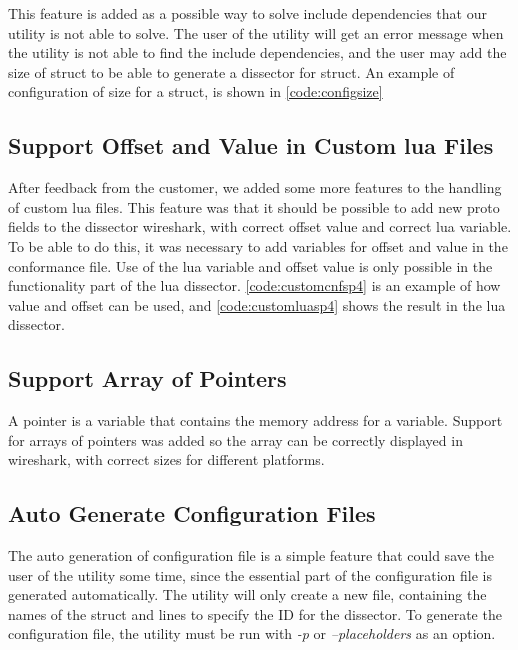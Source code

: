 This feature is added as a possible way to solve include dependencies that our 
\gls{utility} is not able to solve. The user of the \gls{utility} will get an error 
message when the \gls{utility} is not able to find the include dependencies, and the 
user may add the size of \gls{struct} to be able to generate a \gls{dissector} for \gls{struct}. 
An example of configuration of size for a \gls{struct}, is shown in 
\autoref{code:configsize}



\subsection{Support Offset and Value in Custom \Gls{lua} Files}
After feedback from the customer, we added some more features to 
the handling of custom \Gls{lua} files. This feature was that it should be possible 
to add new proto fields to the \gls{dissector} \Gls{wireshark}, with correct offset value 
and correct \Gls{lua} variable. To be able to do this, it was necessary to add
variables for offset and value in the conformance file. Use of the \Gls{lua} 
variable and offset value is only possible in the functionality part of the 
\Gls{lua} \gls{dissector}. \autoref{code:customcnfsp4} is an example of how value and 
offset can be used, and \autoref{code:customluasp4} shows the result in the \Gls{lua} 
\gls{dissector}.





\subsection{Support Array of Pointers}
A pointer is a variable that contains the memory address for a variable. 
Support for arrays of pointers was added so the array can be correctly 
displayed in \Gls{wireshark}, with correct sizes for different platforms.

\subsection{Auto Generate Configuration Files}
The auto generation of configuration file is a simple feature that could save 
the user of the \gls{utility} some time, since the essential part of the 
configuration file is generated automatically. The \gls{utility} will only create a new 
file, containing the names of the \gls{struct} and lines to specify the ID for the 
\gls{dissector}. To generate the configuration file, the \gls{utility} must be run with 
\emph{-p} or \emph{--placeholders} as an option.

